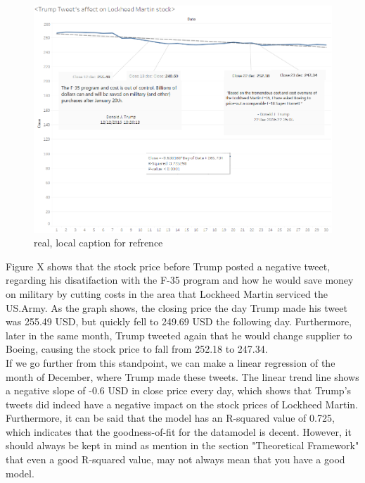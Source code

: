 \documentclass[11pt]{article}
\begin{document}
\begin{figure}[H] %
	\centering %
\includegraphics [scale= .6]  {TrumpLockheedFinalDec.PNG}    %
	\caption[Optional caption] {real, local caption for refrence}
	\label{fig:wordcloudBliz}

\end{figure}

Figure X shows that the stock price before Trump posted a negative tweet, regarding his disatifaction with the F-35 program and how he would save money on military by cutting costs in the area that Lockheed Martin serviced the US.Army. As the graph shows, the closing price the day Trump made his tweet was 255.49 USD, but quickly fell to 249.69 USD the following day. Furthermore, later in the same month, Trump tweeted again that he would change supplier to Boeing, causing the stock price to fall from 252.18 to 247.34. \\

If we go further from this standpoint, we can make a linear regression of the month of December, where Trump made these tweets. The linear trend line shows a negative slope of -0.6 USD in close price every day, which shows that Trump's tweets did indeed have a negative impact on the stock prices of Lockheed Martin. Furthermore, it can be said that the model has an R-squared value of 0.725, which indicates that the goodness-of-fit for the datamodel is decent. However, it should always be kept in mind as mention in the section "Theoretical Framework" that even a good R-squared value, may not always mean that you have a good model. \\
\end{document}
